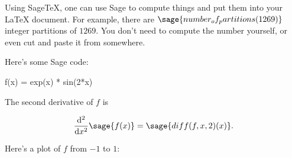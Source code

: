 \documentclass{amsart}
\begin{document}
Using Sage\TeX, one can use Sage to compute things and put them into
your \LaTeX{} document. For example, there are
$\sage{number_of_partitions(1269)}$ integer partitions of $1269$.
You don't need to compute the number yourself, or even cut and paste
it from somewhere.

Here's some Sage code:

\begin{sageblock}
    f(x) = exp(x) * sin(2*x)
\end{sageblock}

The second derivative of $f$ is

\[
  \frac{\mathrm{d}^{2}}{\mathrm{d}x^{2}} \sage{f(x)} =
  \sage{diff(f, x, 2)(x)}.
\]

Here's a plot of $f$ from $-1$ to $1$:

\end{document}
